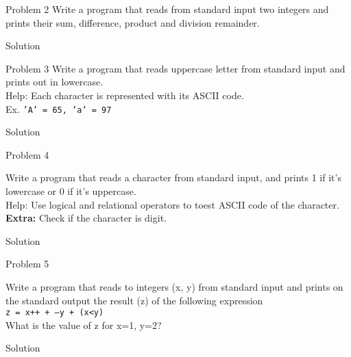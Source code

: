 \begin{frame}[fragile]{Problem 2}
Write a program that reads from standard input two integers and prints their
sum, difference, product and division remainder.
	\begin{exampleblock}{Solution}
		
	\end{exampleblock}
\end{frame}

\begin{frame}[fragile]{Problem 3}
Write a program that reads uppercase letter from standard input and prints out
in lowercase.\\ Help: Each character is represented with its ASCII code.\\
Ex. \texttt{'А' = 65, 'а' = 97}
	\begin{exampleblock}{Solution}
		
	\end{exampleblock}
\end{frame}

\begin{frame}[fragile]{Problem 4}
\begin{scriptsize}
Write a program that reads a character from standard input, and prints 1 if it's
lowercase or 0 if it's uppercase.\\ Help: Use logical and relational
operators to toest ASCII code of the character.\\
\textbf{Extra:} Check if the character is digit.
\end{scriptsize}
\begin{exampleblock}{Solution}
			
\end{exampleblock}
\end{frame}

\begin{frame}[fragile]{Problem 5}
\begin{scriptsize}
Write a program that reads to integers (x, y) from standard input and prints on
the standard output the result (z) of the following expression\\ \texttt{z
= x++ + ---y + (x<y)}\\ What is the value of z for x=1, y=2?
\end{scriptsize}
	\begin{exampleblock}{Solution}
		
	\end{exampleblock}
\end{frame}

